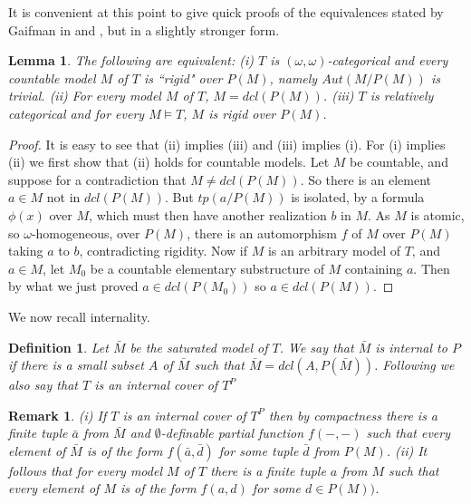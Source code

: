 \documentclass[12pt]{article}
\newtheorem{Definition}[Theorem]{Definition}
\newtheorem{Remark}[Theorem]{Remark}
\newtheorem{Lemma}[Theorem]{Lemma}
\begin{document}
It is convenient at this point to give quick proofs of the equivalences   stated by  Gaifman in \cite{Gaifman} and \cite{Gaifman-conjecture}, but in a slightly stronger form. 

\begin{Lemma} The following are equivalent:
\newline
(i) $T$ is $(\omega, \omega)$-categorical and every countable model $M$ of $T$ is ``rigid" over $P(M)$, namely $Aut(M/P(M))$ is trivial.
\newline
(ii) For every model $M$ of $T$, $M = dcl(P(M))$. 
\newline
(iii) $T$ is relatively categorical and for every $M\models T$, $M$ is rigid over $P(M)$. 
\end{Lemma}
\begin{proof}   It is easy to see that (ii) implies (iii)  and (iii) implies (i). 
\newline
For (i) implies (ii) we first show that (ii) holds for countable models.  Let $M$ be countable, and suppose for a contradiction that $M\neq dcl(P(M))$.  So there is an element $a\in M$ not in $dcl(P(M))$. But $tp(a/P(M))$ is isolated, by  a formula $\phi(x)$ over $M$, which must then have another realization $b$ in $M$. As $M$ is atomic, so $\omega$-homogeneous, over $P(M)$, there is an automorphism $f$ of $M$ over $P(M)$ taking $a$ to $b$, contradicting rigidity. 
Now if $M$ is an arbitrary model of $T$, and $a\in M$, let $M_{0}$ be a countable elementary substructure of $M$ containing $a$. Then by what we just proved $a\in dcl(P(M_{0}))$ so $a\in dcl(P(M))$. 
\end{proof} 

We now recall internality. 
\begin{Definition} Let ${\bar M}$ be the saturated model of $T$. We say  that ${\bar M}$ is internal to $P$ if there is a small subset $A$ of ${\bar M}$ such that ${\bar M} = dcl(A,P({\bar M}))$.
Following \cite{Hrushovski} we also say that $T$ is an internal cover of $T^{P}$
\end{Definition} 

\begin{Remark}
(i) If  $T$ is an internal cover of $T^{P}$ then by compactness there is a finite tuple ${\bar a}$ from  ${\bar M}$ and $\emptyset$-definable partial function  $f(-,-)$ such that every element of ${\bar M}$ is of the form $f({\bar a}, {\bar d})$ for some tuple ${\bar d}$ from $P(M)$. 
\newline
(ii) It follows that for every model $M$ of $T$ there is a finite tuple $a$ from $M$ such that every element of $M$ is of the form $f(a,d)$ for some $d\in P(M))$. 
\end{Remark}
\end{document}
